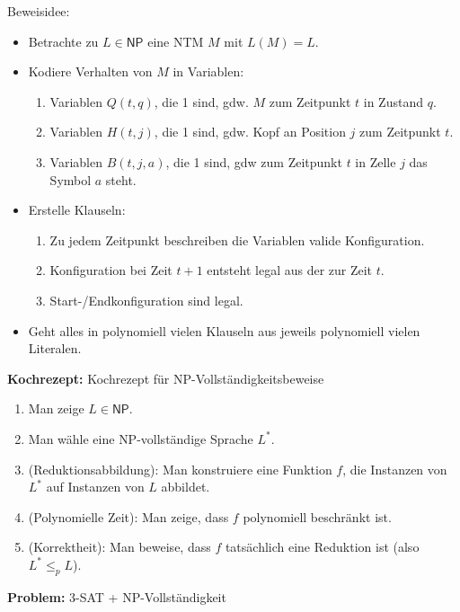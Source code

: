 \documentclass[a4paper,graphics,11pt]{article}
\begin{document}
Beweisidee:
\begin{itemize}
    \item Betrachte zu $L \in \textsf{NP}$ eine NTM $M$ mit $L(M) = L$.
    \item Kodiere Verhalten von $M$ in Variablen:
        \begin{enumerate}
            \item Variablen $Q(t,q)$, die 1 sind, gdw. $M$ zum Zeitpunkt $t$ in Zustand $q$.
            \item Variablen $H(t,j)$, die 1 sind, gdw. Kopf an Position $j$ zum Zeitpunkt $t$.
            \item Variablen $B(t,j,a)$, die 1 sind, gdw zum Zeitpunkt $t$ in Zelle $j$ das Symbol $a$ steht.
        \end{enumerate}
    \item Erstelle Klauseln:
        \begin{enumerate}
            \item Zu jedem Zeitpunkt beschreiben die Variablen valide Konfiguration.
            \item Konfiguration bei Zeit $t+1$ entsteht legal aus der zur Zeit $t$.
            \item Start-/Endkonfiguration sind legal.
        \end{enumerate}
    \item Geht alles in polynomiell vielen Klauseln aus jeweils polynomiell vielen Literalen.
\end{itemize}

\newpage

\textbf{Kochrezept:} Kochrezept für \textsf{NP}-Vollständigkeitsbeweise

\begin{enumerate}
    \item Man zeige $L \in \textsf{NP}$.
    \item Man wähle eine \textsf{NP}-vollständige Sprache $L^*$.
    \item (Reduktionsabbildung): Man konstruiere eine Funktion $f$, die Instanzen von $L^*$ auf
        Instanzen von $L$ abbildet.
    \item (Polynomielle Zeit): Man zeige, dass $f$ polynomiell beschränkt ist.
    \item (Korrektheit): Man beweise, dass $f$ tatsächlich eine Reduktion ist
        (also $L^* \leq_p L$).
\end{enumerate}

\strut

\textbf{Problem:} 3-SAT + \textsf{NP}-Vollständigkeit
\end{document}
